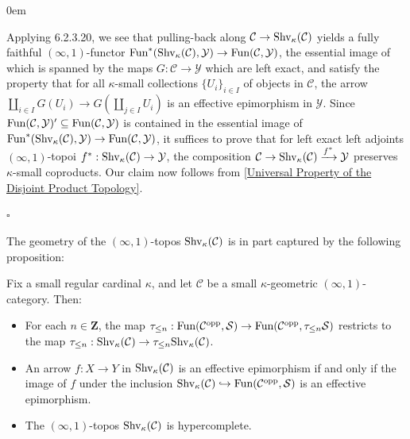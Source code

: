 \documentclass[10pt]{article}
\newcommand{\mS}{\mathcal S}
\newcommand{\C}{\mathcal C}
\newcommand{\cY}{\mathcal{Y}}
\newcommand{\ZZ}{\mathbb{Z}}
\def\ZZ{{\mathbf Z}}
\renewcommand{\qed}{\hfill$\square$}
\renewenvironment{proof}{\begin{addmargin}[1em]{0em}\begin{newproof}}{\end{newproof}\end{addmargin}\qed}
\theoremstyle{witharg}
\theoremstyle{witharg}
\theoremstyle{witharg2}
\begin{document}
\begin{proof}

    Applying  6.2.3.20, we see that pulling-back along $\C\rightarrow \textnormal{Shv}_{\kappa}(\C)$ yields a fully faithful $(\infty,1)$-functor $\textnormal{Fun}^*(\textnormal{Shv}_{\kappa}(\C),\cY)\rightarrow \textnormal{Fun}(\C,\cY)$, the essential image of which is spanned by the maps $G:\C\rightarrow \cY$ which are left exact, and satisfy the property that for all $\kappa$-small collections $\{U_i\}_{i\in I}$ of objects in $\C$, the arrow $\coprod_{i\in I}G(U_i)\rightarrow G(\coprod_{j\in I}U_i)$ is an effective epimorphism in $\cY$. Since $\textnormal{Fun}(\C,\cY)^{\prime}\subseteq \textnormal{Fun}(\C,\cY)$ is contained in the essential image of $\textnormal{Fun}^*(\textnormal{Shv}_{\kappa}(\C),\cY)\rightarrow \textnormal{Fun}(\C,\cY)$, it suffices to prove that for left exact left adjoints $(\infty,1)$-topoi $f^*:\textnormal{Shv}_{\kappa}(\C)\rightarrow \cY$, the composition $\C\rightarrow \textnormal{Shv}_{\kappa}(\C)\xrightarrow{f^*}\cY$ preserves $\kappa$-small coproducts. Our claim now follows from \ref{Universal Property of the Disjoint Product Topology}. 
    
    
 
\end{proof}

\noindent The geometry of the $(\infty,1)$-topos $\textnormal{Shv}_\kappa(\C)$ is in part captured by the following proposition:


\begin{proposition}{}

    Fix a small regular cardinal $\kappa$, and let $\C$ be a small $\kappa$-geometric $(\infty,1)$-category. Then: 

    \begin{itemize}

        \item [$(1)$] For each $n\in \ZZ$, the map $\tau_{\leq n}:\textnormal{Fun}(\C^{\textnormal{opp}},\mS)\rightarrow \textnormal{Fun}(\C^{\textnormal{opp}},\tau_{\leq n}\mS)$ restricts to the map $\tau_{\leq n}:\textnormal{Shv}_\kappa(\C)\rightarrow \tau_{\leq n}\textnormal{Shv}_\kappa(\C)$.
    
        \item [$(1)$] An arrow $f:X\rightarrow Y$ in $\textnormal{Shv}_\kappa(\C)$ is an effective epimorphism if and only if the image of $f$ under the inclusion $\textnormal{Shv}_\kappa(\C)\hookrightarrow \textnormal{Fun}(\C^{\textnormal{opp}},\mS)$ is an effective epimorphism. 

        \item [$(2)$] The $(\infty,1)$-topos $\textnormal{Shv}_\kappa(\C)$ is hypercomplete. 
        
        
    \end{itemize}

    
\end{proposition}
\end{document}

